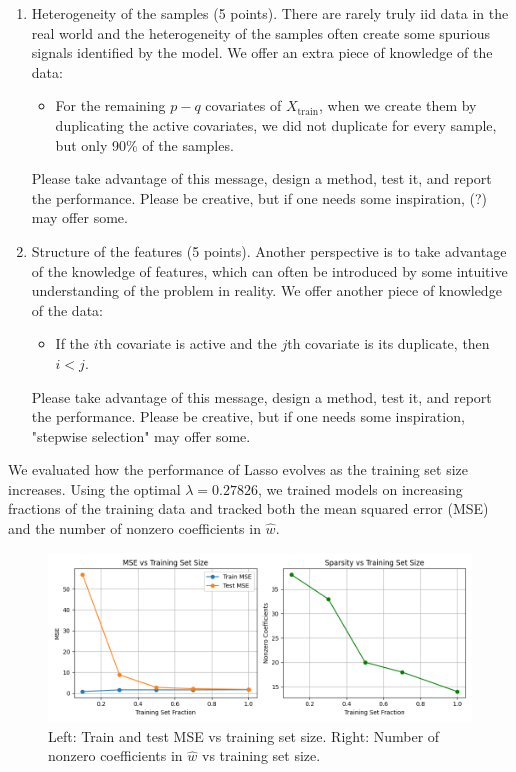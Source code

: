 \documentclass{article}
\begin{document}
\begin{enumerate}[label=(\alph*)]
\item Heterogeneity of the samples (5 points). There are rarely truly iid data in the real world and the
heterogeneity of the samples often create some spurious signals identified by the model. We offer an
extra piece of knowledge of the data:
\begin{itemize}
\item For the remaining $p - q$ covariates of $X_{\text{train}}$, when we create them by duplicating the active
covariates, we did not duplicate for every sample, but only 90\% of the samples.
\end{itemize}
Please take advantage of this message, design a method, test it, and report the performance. Please
be creative, but if one needs some inspiration, (?) may offer some.

\item Structure of the features (5 points). Another perspective is to take advantage of the knowledge of
features, which can often be introduced by some intuitive understanding of the problem in reality. We
offer another piece of knowledge of the data:
\begin{itemize}
\item If the $i$th covariate is active and the $j$th covariate is its duplicate, then $i < j$.
\end{itemize}
Please take advantage of this message, design a method, test it, and report the performance. Please
be creative, but if one needs some inspiration, "stepwise selection" may offer some.
\end{enumerate}

We evaluated how the performance of Lasso evolves as the training set size increases. Using the optimal \( \lambda = 0.27826 \), we trained models on increasing fractions of the training data and tracked both the mean squared error (MSE) and the number of nonzero coefficients in \( \hat{w} \).

\begin{figure}[H]
    \centering
    \includegraphics[width=\textwidth]{lasso_consistency_plots.png}
    \caption{Left: Train and test MSE vs training set size. Right: Number of nonzero coefficients in \( \hat{w} \) vs training set size.}
\end{figure}
\end{document}

